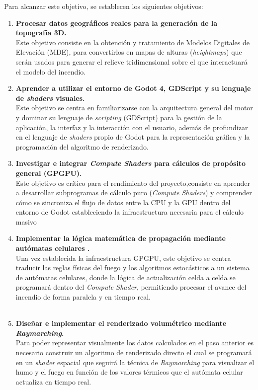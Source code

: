 Para alcanzar este objetivo, se establecen los siguientes objetivos:

\begin{enumerate}
    \item \textbf{Procesar datos geográficos reales para la generación de la topografía 3D.} \\
    Este objetivo consiste en la obtención y tratamiento de Modelos Digitales de Elevación (MDE), para convertirlos en mapas de alturas (\textit{heightmaps}) que serán usados para generar el relieve tridimensional sobre el que interactuará el modelo del incendio.
    
   \item \textbf{Aprender a utilizar el entorno de Godot 4, GDScript y su lenguaje de \textit{shaders} visuales.} \\
    Este objetivo se centra en familiarizarse con la arquitectura general del motor y dominar su lenguaje de \textit{scripting} (GDScript) para la gestión de la aplicación, la interfaz y la interacción con el usuario, además de profundizar en el lenguaje de \textit{shaders} propio de Godot para la representación gráfica y la programación del algoritmo de renderizado.
    
    \item \textbf{Investigar e integrar \textit{Compute Shaders} para cálculos de propósito general (GPGPU).} \\
    Este objetivo es crítico para el rendimiento del proyecto,consiste en aprender a desarrollar subprogramas de cálculo puro (\textit{Compute Shaders}) y comprender cómo se  sincroniza el flujo de datos entre la CPU y la GPU dentro del entorno de Godot estableciendo la infraestructura necesaria para el cálculo masivo
    
    \item \textbf{Implementar la lógica matemática de propagación mediante autómatas celulares .} \\
       Una vez establecida la infraestructura GPGPU, este objetivo se centra traducir las reglas físicas del fuego y los algoritmos estocásticos a un sistema de autómatas celulares, donde la lógica de actualización celda a celda se programará dentro del \textit{Compute Shader}, permitiendo procesar el avance del incendio de forma paralela y en tiempo real.\\\\

    \item \textbf{Diseñar e implementar el renderizado volumétrico mediante \textit{Raymarching}.} \\
    Para poder representar visualmente los datos calculados en el paso anterior es necesario construir un algoritmo de renderizado directo el cual se programará en un \textit{shader} espacial que seguirá la técnica de \textit{Raymarching} para visualizar el humo y el fuego  en función de los valores térmicos que el autómata celular actualiza en tiempo real.
    

\end{enumerate}
